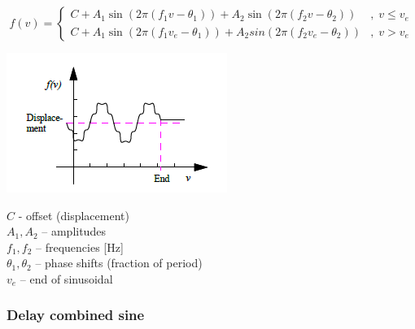 $$
  f(v)=\left\{\begin{array}{ll}
  C+A_1\sin(2\pi(f_1v-\theta_1)) + A_2\sin(2\pi(f_2v-\theta_2)) &,\; v \leq v_e \\
  C+A_1\sin(2\pi(f_1v_e-\theta_1)) + A_2 sin(2\pi(f_2v_e-\theta_2)) &,\; v > v_e
  \end{array}\right.
$$
\noindent
\begin{minipage}{0.45\textwidth}
  \includegraphics[width=\textwidth]{Figures/4-Functions-combinedSine}
\end{minipage}%
\hfill\begin{minipage}{0.5\textwidth}
  $C$ - offset (displacement) \\
  $A_1, A_2$ -- amplitudes \\
  $f_1, f_2$ -- frequencies [Hz] \\
  $\theta_1, \theta_2$ -- phase shifts (fraction of period) \\
  $v_e$ -- end of sinusoidal
\end{minipage}


\subsubsection{Delay combined sine}

